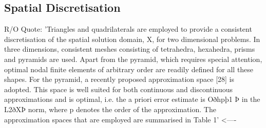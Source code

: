 \subsection{Spatial Discretisation}

R/O Quote: 'Triangles and quadrilaterals are employed to provide a consistent
discretisation of the spatial solution domain, X, for two
dimensional problems. In three dimensions, consistent meshes
consisting of tetrahedra, hexahedra, prisms and pyramids are used.
Apart from the pyramid, which requires special attention, optimal
nodal finite elements of arbitrary order are readily defined for all
these shapes. For the pyramid, a recently proposed approximation
space [28] is adopted. This space is well suited for both continuous
and discontinuous approximations and is optimal, i.e. the a priori
error estimate is Oðhpþ1 Þ in the L2ðXÞ norm, where p denotes the
order of the approximation. The approximation spaces that are employed
are summarised in Table 1' <----

